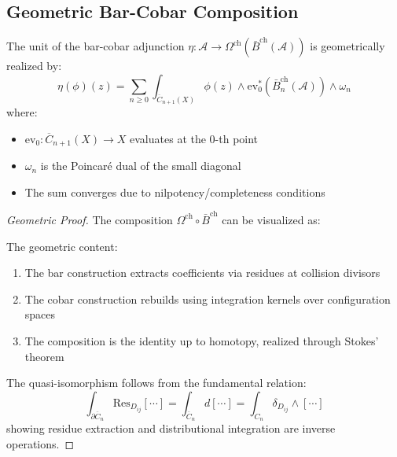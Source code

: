 \subsection{Geometric Bar-Cobar Composition}

\begin{theorem}\label{thm:geom-unit}
The unit of the bar-cobar adjunction $\eta: \mathcal{A} \to \Omega^{\text{ch}}(\bar{B}^{\text{ch}}(\mathcal{A}))$ is geometrically realized by:
\[
\eta(\phi)(z) = \sum_{n \geq 0} \int_{\overline{C}_{n+1}(X)} \phi(z) \wedge \text{ev}^*_{0}\left(\bar{B}_n^{\text{ch}}(\mathcal{A})\right) \wedge \omega_n
\]
where:
\begin{itemize}
\item $\text{ev}_0: \overline{C}_{n+1}(X) \to X$ evaluates at the 0-th point
\item $\omega_n$ is the Poincaré dual of the small diagonal
\item The sum converges due to nilpotency/completeness conditions
\end{itemize}
\end{theorem}

\begin{proof}[Geometric Proof]
The composition $\Omega^{\text{ch}} \circ \bar{B}^{\text{ch}}$ can be visualized as:

\begin{center}
\end{center}

The geometric content:
\begin{enumerate}
\item The bar construction extracts coefficients via residues at collision divisors
\item The cobar construction rebuilds using integration kernels over configuration spaces
\item The composition is the identity up to homotopy, realized through Stokes' theorem
\end{enumerate}

The quasi-isomorphism follows from the fundamental relation:
\[
\int_{\partial \overline{C}_n} \text{Res}_{D_{ij}}[\cdots] = \int_{\overline{C}_n} d[\cdots] = \int_{C_n} \delta_{D_{ij}} \wedge [\cdots]
\]
showing residue extraction and distributional integration are inverse operations.
\end{proof}

